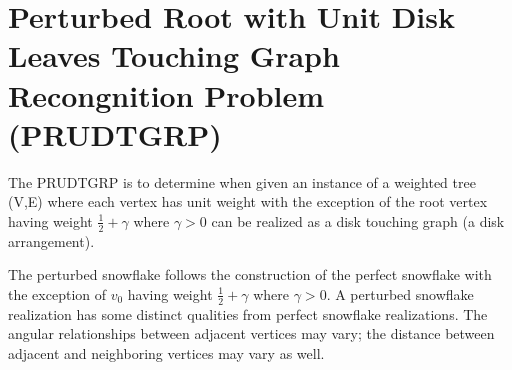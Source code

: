 \section{Perturbed Root with Unit Disk Leaves Touching Graph Recongnition Problem (PRUDTGRP)}

The PRUDTGRP is to determine when given an instance of a weighted tree (V,E) where each vertex has unit weight with the exception of the root vertex having weight $\frac{1}{2}+\gamma$ where $\gamma>0$ can be realized as a disk touching graph (a disk arrangement).  

The perturbed snowflake follows the construction of the perfect snowflake with the exception of $v_0$ having weight $\frac{1}{2} + \gamma$ where $\gamma > 0$.
A perturbed snowflake realization has some distinct qualities from perfect snowflake realizations.  
The angular relationships between adjacent vertices may vary; the distance between adjacent and neighboring vertices may vary as well.


